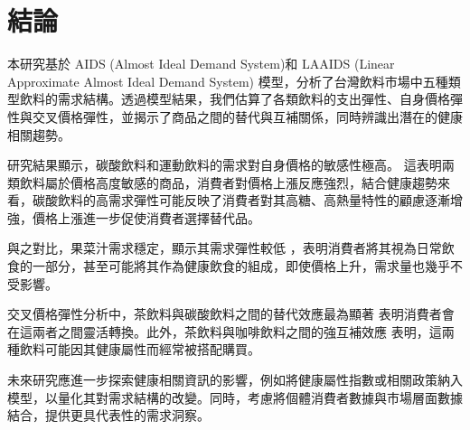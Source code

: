 \section{結論} \label{conclusion}

本研究基於 AIDS (Almost Ideal Demand System)和 LAAIDS (Linear Approximate Almost Ideal Demand System) 模型，分析了台灣飲料市場中五種類型飲料的需求結構。透過模型結果，我們估算了各類飲料的支出彈性、自身價格彈性與交叉價格彈性，並揭示了商品之間的替代與互補關係，同時辨識出潛在的健康相關趨勢。

研究結果顯示，碳酸飲料和運動飲料的需求對自身價格的敏感性極高。
這表明兩類飲料屬於價格高度敏感的商品，消費者對價格上漲反應強烈，結合健康趨勢來看，碳酸飲料的高需求彈性可能反映了消費者對其高糖、高熱量特性的顧慮逐漸增強，價格上漲進一步促使消費者選擇替代品。

與之對比，果菜汁需求穩定，顯示其需求彈性較低%
，表明消費者將其視為日常飲食的一部分，甚至可能將其作為健康飲食的組成，即使價格上升，需求量也幾乎不受影響。

交叉價格彈性分析中，茶飲料與碳酸飲料之間的替代效應最為顯著%
表明消費者會在這兩者之間靈活轉換。此外，茶飲料與咖啡飲料之間的強互補效應%
表明，這兩種飲料可能因其健康屬性而經常被搭配購買。

未來研究應進一步探索健康相關資訊的影響，例如將健康屬性指數或相關政策納入模型，以量化其對需求結構的改變。同時，考慮將個體消費者數據與市場層面數據結合，提供更具代表性的需求洞察。
